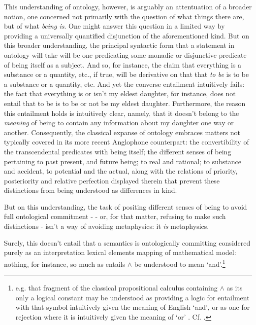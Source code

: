 \documentclass[]{article}
\begin{document}
This understanding of ontology, 
however, 
is arguably 
an attentuation of a broader notion,
one concerned not primarily with the question of what things there are, but of what \emph{being is}. 
One might answer this question in a limited way by providing a universally quantified disjunction of the aforementioned kind. 
But on this broader understanding, 
the principal syntactic form that a statement in ontology will take will be one predicating some monadic or disjunctive predicate of being itself as a subject. 
And so, for instance, the claim that everything is a substance or a quantity, etc., 
if true, 
will be derivative on that that \emph{to be} is to be a substance or a quantity, etc.
And yet the converse entailment intuitively fails: 
the fact that everything is or isn't my eldest daughter, for instance, 
does not entail that to be is to be or not be my eldest daughter. 
Furthermore, the reason this entailment holds is intuitively clear, 
namely, 
that it doesn't belong to the \emph{meaning} of being to contain any information about my daughter one way or another. 
Consequently, the classical expanse of ontology embraces matters not typically covered in its more recent Anglophone counterpart: 
the convertibility of the transcendental predicates with being itself;  
the different senses of being pertaining 
to past present, and future being;
to real and rational;
to substance and accident, 
to potential and the actual, 
along with the relations of priority, posteriority and relative perfection displayed therein
that prevent these distinctions from being understood as differences in kind. 

But on this understanding, the task of positing different senses of being to avoid full ontological commitment - 
- or, for that matter, refusing to make such distinctions - 
isn't a way of avoiding metaphysics: it \emph{is} metaphysics.

Surely, this doesn't entail that a semantics is ontologically committing considered purely as an interpretation lexical elements mapping of mathematical model: 
nothing, for instance, so much as entails $\wedge$ be understood to mean `and'.\footnote{
	e.g. that fragment of the classical propositional calculus containing $\wedge$ as its only a logical constant may be understood as providing a logic for entailment with that symbol intuitively given the meaning of English `and', 
	or as one for rejection where it is intuitively given the meaning of `or' . Cf. \autocite[222]{Kripke2015}.}
\end{document}

